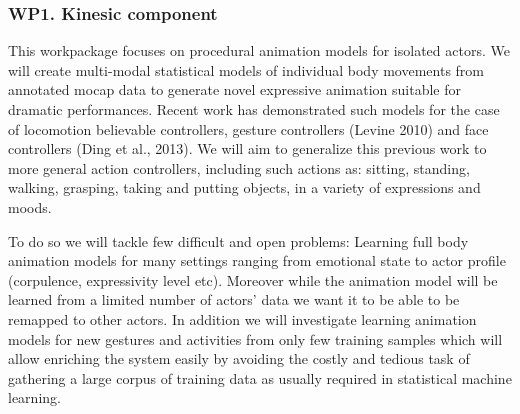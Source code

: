 
\subsubsection{WP1. Kinesic component} 

This workpackage focuses on procedural animation models for isolated actors. We will create multi-modal statistical models of individual body movements from annotated mocap data to generate novel expressive animation suitable for  dramatic performances. Recent work has demonstrated such models for the case of locomotion believable controllers, gesture controllers (Levine 2010) and face controllers (Ding et al., 2013). We will aim to generalize this previous work to more general action controllers, including such actions as: sitting, standing, walking, grasping, taking and putting objects, in a variety of expressions and moods. 

To do so we will tackle few difficult and open problems: Learning full body animation models for many settings ranging from emotional state to actor profile (corpulence, expressivity level etc). Moreover while the animation model will be learned from a limited number of actors' data we want it to be able to be remapped to other actors. In addition we will investigate learning animation models for new gestures and activities from only few training samples which will allow enriching the system easily by avoiding the costly and tedious task of gathering a large corpus of training data as usually required in statistical machine learning.

